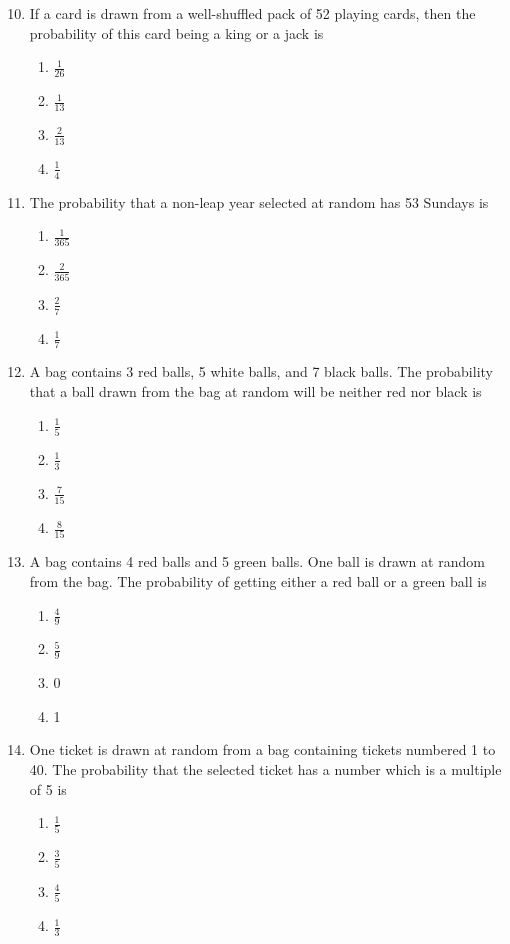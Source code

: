 \documentclass[a4paper, 12pt]{article}
\begin{document}
\begin{multicols}{2}
	
	
	
	\begin{enumerate}
		\setcounter{enumi}{9}
		
		\item If a card is drawn from a well-shuffled pack of 52 playing cards, then the probability of this card being a king or a jack is
		\begin{enumerate}
			\item $\frac{1}{26}$
			\item $\frac{1}{13}$
			\item $\frac{2}{13}$
			\item $\frac{1}{4}$
		\end{enumerate}
		
		\item The probability that a non-leap year selected at random has 53 Sundays is
		\begin{enumerate}
			\item $\frac{1}{365}$
			\item $\frac{2}{365}$
			\item $\frac{2}{7}$
			\item $\frac{1}{7}$
		\end{enumerate}
		
		\item A bag contains 3 red balls, 5 white balls, and 7 black balls. The probability that a ball drawn from the bag at random will be neither red nor black is
		\begin{enumerate}
			\item $\frac{1}{5}$
			\item $\frac{1}{3}$
			\item $\frac{7}{15}$
			\item $\frac{8}{15}$
		\end{enumerate}
		
		\item A bag contains 4 red balls and 5 green balls. One ball is drawn at random from the bag. The probability of getting either a red ball or a green ball is
		\begin{enumerate}
			\item $\frac{4}{9}$
			\item $\frac{5}{9}$
			\item 0
			\item 1
		\end{enumerate}
		
		\item One ticket is drawn at random from a bag containing tickets numbered 1 to 40. The probability that the selected ticket has a number which is a multiple of 5 is
		\begin{enumerate}
			\item $\frac{1}{5}$
			\item $\frac{3}{5}$
			\item $\frac{4}{5}$
			\item $\frac{1}{3}$
		\end{enumerate}
		

\end{enumerate}
\end{multicols}
\end{document}
